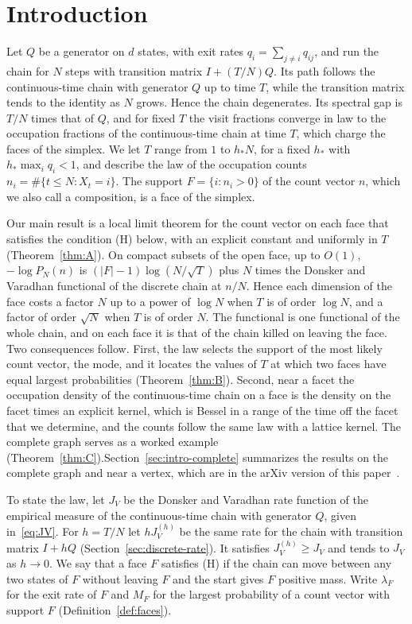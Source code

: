 \section{Introduction}\label{sec:intro}

Let $Q$ be a generator on $d$ states, with exit rates $q_i=\sum_{j\ne i}q_{ij}$, and run the chain for $N$ steps with
transition matrix $I+(T/N)Q$. Its path follows the continuous-time chain with
generator $Q$ up to time $T$, while the transition matrix tends to the identity
as $N$ grows. Hence the chain degenerates. Its spectral gap is $T/N$ times that of
$Q$, and
for fixed $T$ the visit fractions converge in law to the occupation fractions of
the continuous-time chain at time $T$, which charge the faces of the simplex. We
let $T$ range from $1$ to $h_*N$, for a fixed $h_*$ with $h_*\max_iq_i<1$, and
describe the law of the occupation counts $n_i=\#\{t\le N:X_t=i\}$. The support
$F=\{i:n_i>0\}$ of the count vector $n$, which we also call a composition, is a face of the
simplex.

Our main result is a local limit theorem for the count vector on each face that satisfies
the condition (H) below, with
an explicit constant and uniformly in $T$ (Theorem~\ref{thm:A}). On compact subsets of
the open face, up to $O(1)$,
$-\log P_N(n)$ is $(|F|-1)\log(N/\sqrt T)$ plus $N$ times the Donsker and
Varadhan functional of the discrete chain at $n/N$. Hence each dimension of the
face costs a factor $N$ up to a power of $\log N$ when $T$ is of order $\log N$,
and a factor of order $\sqrt N$ when $T$ is of order $N$. The functional is one functional of the whole chain, and on each
face it is that of the chain killed on leaving the face. Two consequences follow. First, the law selects the support of the most
likely count vector, the mode, and it locates the values of $T$ at which two
faces have equal largest probabilities (Theorem~\ref{thm:B}). Second, near a
facet the occupation density of the continuous-time chain on a face is the
density on the facet times an explicit kernel, which is Bessel in a range of
the time off the facet that we determine, and the counts follow the same law
with a lattice kernel. \ifarxivbuild The complete graph serves as a worked
example (Theorem~\ref{thm:C}).\else Section~\ref{sec:intro-complete} summarizes the results on the
complete graph and near a vertex, which are in the arXiv version of this paper~\cite{arxivC1}.\fi

To state the law, let $J_V$ be the Donsker and Varadhan rate function of the
empirical measure of the continuous-time chain with generator $Q$, given
in~\eqref{eq:JV}. For $h=T/N$ let $hJ^{(h)}_V$ be the same rate for the chain with
transition matrix $I+hQ$ (Section~\ref{sec:discrete-rate}). It satisfies
$J^{(h)}_V\ge J_V$ and tends to $J_V$ as $h\to0$. We say that a face $F$ satisfies (H)
if the chain can move
between any two states of $F$ without leaving $F$ and the start gives $F$
positive mass. Write $\lambda_F$ for the exit rate of $F$ and $M_F$ for the
largest probability of a count vector with support $F$
(Definition~\ref{def:faces}).

